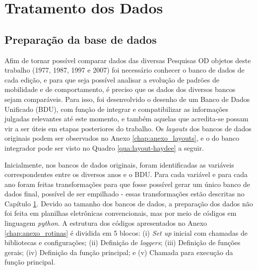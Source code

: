 \chapter{Tratamento dos Dados}\label{chap:trat-dados}

\section{Preparação da base de dados}\label{sec:bd-prep}

Afim de tornar possível comparar dados das diversas Pesquisas OD objetos deste trabalho (1977, 1987, 1997 e 2007) foi necessário conhecer o banco de dados de cada edição, e para que seja possível analisar a evolução de padrões de mobilidade e de comportamento, é preciso que os dados dos diversos bancos sejam comparáveis. Para isso, foi desenvolvido o desenho de um Banco de Dados Unificado (BDU), com função de integrar e compatibilizar as informações julgadas relevantes até este momento, e também aquelas que acredita-se possam vir a ser úteis em etapas posteriores do trabalho. Os \emph{layouts} dos bancos de dados originais podem ser observados no Anexo \ref{chap:anexo_layouts}, e o do banco integrador pode ser visto no Quadro \ref{qua:layout-haydee} a seguir.

Inicialmente, nos bancos de dados originais, foram identificadas as variáveis correspondentes entre os diversos anos e o BDU. Para cada variável e para cada ano foram feitas transformações para que fosse possível gerar um único banco de dados final, possível de ser empilhado - essas transformações estão descritas no Capítulo \ref{chap:trat-dados}. Devido ao tamanho dos bancos de dados, a preparação dos dados não foi feita em planilhas eletrônicas convencionais, mas por meio de códigos em linguagem \textit{python}. A estrutura dos códigos apresentados no Anexo \ref{chap:anexo_rotinas} é dividida em 5 blocos: (i) \textit{Set up} inicial com chamadas de bibliotecas e configurações; (ii) Definição de \textit{loggers}; (iii) Definição de funções gerais; (iv) Definição da função principal; e (v) Chamada para execução da função principal.\\ 

